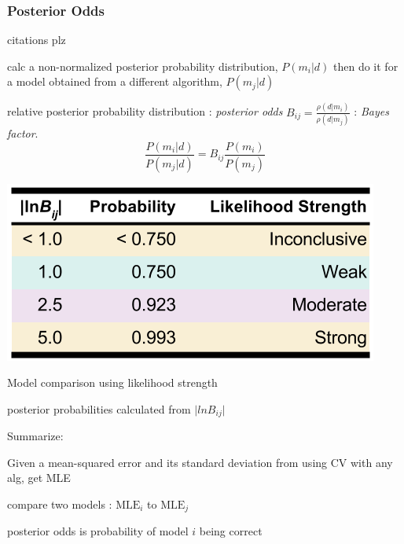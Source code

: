 \begin{frame}
  \frametitle{Posterior Odds}
  \footnotesize
  citations plz

  calc a non-normalized posterior probability distribution, $P(m_i|d)$
  then do it for a model obtained from a different algorithm, $P(m_j|d)$

  relative posterior probability distribution : \textit{posterior odds}
  $B_{ij} = \frac{\rho(d|m_i)}{\rho(d|m_j)}$ :  \textit{Bayes factor}.
  $$ \frac{P(m_i|d)}{P(m_j|d)} = B_{ij} \frac{P(m_i)}{P(m_j)} $$
  
  \begin{table}
    \centering
    \includegraphics[width=0.4\linewidth]{./figures/evidence-strength.png}
    \caption{Model comparison using likelihood strength}
  \end{table}
  
  posterior probabilities calculated from $\lvert lnB_{ij} \rvert$
  
  Summarize:
  
  Given a mean-squared error and its standard deviation from using CV with any alg, get MLE

  compare two models : $\text{MLE}_i$ to $\text{MLE}_j$
  
  posterior odds is probability of model $i$ being correct
\end{frame}
